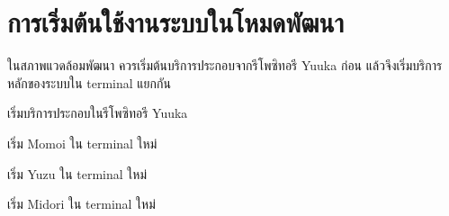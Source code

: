 \section{การเริ่มต้นใช้งานระบบในโหมดพัฒนา}
\hspace*{1.3em}
ในสภาพแวดล้อมพัฒนา ควรเริ่มต้นบริการประกอบจากรีโพซิทอรี Yuuka ก่อน แล้วจึงเริ่มบริการหลักของระบบใน terminal แยกกัน

\begin{mycustomenum2}
    \item เริ่มบริการประกอบในรีโพซิทอรี Yuuka
\begin{figure}[htbp]
\centering
{}
\caption{}
\label{figC:DockerUp}
\end{figure}

    \item เริ่ม Momoi ใน terminal ใหม่
\begin{figure}[htbp]
\centering
{}
\caption{}
\label{figC:MomoiDev}
\end{figure}

    \item เริ่ม Yuzu ใน terminal ใหม่
\begin{figure}[htbp]
\centering
{}
\caption{}
\label{figC:YuzuDev}
\end{figure}

    \item เริ่ม Midori ใน terminal ใหม่
\begin{figure}[htbp]
\centering
{}
\caption{}
\label{figC:MidoriDev}
\end{figure}
\end{mycustomenum2}

